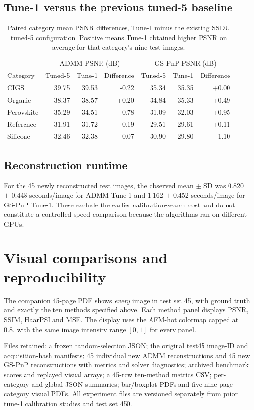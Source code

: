 \documentclass[10pt,a4paper]{article}
\begin{document}
\subsection*{Tune-1 versus the previous tuned-5 baseline}
\begin{table}[H]
\centering\scriptsize
\begin{tabular}{@{}lrrrrrr@{}}
\toprule
& \multicolumn{3}{c}{ADMM PSNR (dB)} &
\multicolumn{3}{c}{GS-PnP PSNR (dB)}\\
Category & Tuned-5 & Tune-1 & Difference &
Tuned-5 & Tune-1 & Difference\\
\midrule
CIGS & 39.75 & 39.53 & -0.22 & 35.34 & 35.35 & +0.00 \\
Organic & 38.37 & 38.57 & +0.20 & 34.84 & 35.33 & +0.49 \\
Perovskite & 35.29 & 34.51 & -0.78 & 31.09 & 32.03 & +0.95 \\
Reference & 31.91 & 31.72 & -0.19 & 29.51 & 29.61 & +0.11 \\
Silicone & 32.46 & 32.38 & -0.07 & 30.90 & 29.80 & -1.10 \\
\bottomrule
\end{tabular}
\caption{Paired category mean PSNR differences,
Tune-1 minus the existing SSDU tuned-5 configuration.
Positive means Tune-1 obtained higher PSNR on average
for that category's nine test images.}
\end{table}

\subsection*{Reconstruction runtime}
For the 45 newly reconstructed test images,
the observed mean $\pm$ SD was
0.820 $\pm$ 0.448 seconds/image for ADMM Tune-1 and
1.162 $\pm$ 0.452 seconds/image for GS-PnP Tune-1.
These exclude the earlier calibration-search cost
and do not constitute a controlled speed comparison
because the algorithms ran on different GPUs.

\section{Visual comparisons and reproducibility}
The companion 45-page PDF shows \emph{every} image in test set 45,
with ground truth and exactly the ten methods specified above.
Each method panel displays PSNR, SSIM, HaarPSI and MSE.
The display uses the AFM-hot colormap capped at 0.8,
with the same image intensity range $[0,1]$ for every panel.

Files retained: a frozen random-selection JSON;
the original test45 image-ID and acquisition-hash manifests;
45 individual new ADMM reconstructions and 45 new GS-PnP
reconstructions with metrics and solver diagnostics;
archived benchmark scores and replayed visual arrays;
a 45-row ten-method metrics CSV;
per-category and global JSON summaries;
bar/boxplot PDFs and five nine-page category visual PDFs.
All experiment files are versioned separately from prior
tune-1 calibration studies and test set 450.
\end{document}
